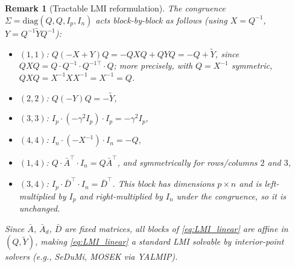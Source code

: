 \documentclass[10pt]{amsart}
\numberwithin{equation}{section}
\newtheorem{remark}[theorem]{Remark}
\begin{document}
\begin{remark}[Tractable LMI reformulation]
The congruence $\Sigma = \mathrm{diag}(Q, Q, I_p, I_n)$ acts block-by-block
as follows (using $X = Q^{-1}$, $Y = Q^{-1}\tilde{Y}Q^{-1}$):
\begin{itemize}
  \item $(1,1)$: $Q(-X+Y)Q = -QXQ + QYQ = -Q + \tilde{Y}$,
        since $QXQ = Q \cdot Q^{-1} \cdot Q^{-1\top} \cdot Q$; more precisely,
        with $Q = X^{-1}$ symmetric, $QXQ = X^{-1} X X^{-1} = X^{-1} = Q$.
  \item $(2,2)$: $Q(-Y)Q = -\tilde{Y}$,
  \item $(3,3)$: $I_p\cdot(-\gamma^2 I_p)\cdot I_p = -\gamma^2 I_p$,
  \item $(4,4)$: $I_n\cdot(-X^{-1})\cdot I_n = -Q$,
  \item $(1,4)$: $Q\cdot\bar{A}^\top\cdot I_n = Q\bar{A}^\top$, and symmetrically for
        rows/columns $2$ and $3$,
  \item $(3,4)$: $I_p \cdot \bar{D}^\top \cdot I_n = \bar{D}^\top$. This block has
        dimensions $p \times n$ and is left-multiplied by $I_p$ and right-multiplied
        by $I_n$ under the congruence, so it is unchanged.
\end{itemize}
Since $\bar{A}$, $\bar{A}_d$, $\bar{D}$ are fixed matrices, all blocks of
\eqref{eq:LMI_linear} are affine in $(Q, \tilde{Y})$, making \eqref{eq:LMI_linear}
a standard LMI solvable by interior-point solvers (e.g., SeDuMi, MOSEK via YALMIP).


\end{remark}
\end{document}
